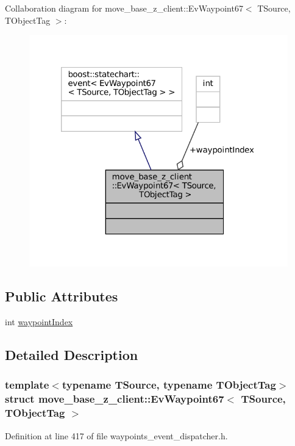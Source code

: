 Collaboration diagram for move\+\_\+base\+\_\+z\+\_\+client\+:\+:Ev\+Waypoint67$<$ T\+Source, T\+Object\+Tag $>$\+:
\nopagebreak
\begin{figure}[H]
\begin{center}
\leavevmode
\includegraphics[width=320pt]{structmove__base__z__client_1_1EvWaypoint67__coll__graph}
\end{center}
\end{figure}
\subsection*{Public Attributes}
\begin{DoxyCompactItemize}
\item 
int \hyperlink{structmove__base__z__client_1_1EvWaypoint67_ad653cf334d6e69860094a86b54cfd781}{waypoint\+Index}
\end{DoxyCompactItemize}


\subsection{Detailed Description}
\subsubsection*{template$<$typename T\+Source, typename T\+Object\+Tag$>$\newline
struct move\+\_\+base\+\_\+z\+\_\+client\+::\+Ev\+Waypoint67$<$ T\+Source, T\+Object\+Tag $>$}



Definition at line 417 of file waypoints\+\_\+event\+\_\+dispatcher.\+h.



